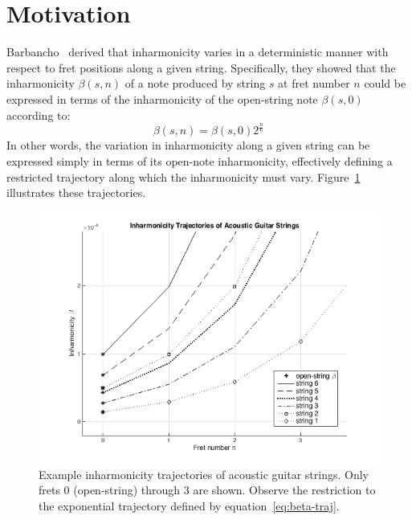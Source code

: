 \documentclass[12pt]{cmuthesis}
\begin{document}
\section{Motivation}
Barbancho~\cite{barbanchoi2012} derived that inharmonicity varies in a deterministic manner with respect to fret positions along a given string. Specifically, they showed that the inharmonicity $\beta(s,n)$ of a note produced by string $s$ at fret number $n$ could be expressed in terms of the inharmonicity of the open-string note $\beta(s,0)$ according to:
\begin{equation} 
\label{eq:beta-traj}
\beta(s,n) = \beta(s,0)2^{\frac{n}{6}}
\end{equation}
In other words, the variation in inharmonicity along a given string can be expressed simply in terms of its open-note inharmonicity, effectively defining a restricted trajectory along which the inharmonicity must vary. Figure~\ref{fig:beta-trajectories-ag} illustrates these trajectories.

\begin{figure}[h] 
\centering
\includegraphics[scale=0.70]{beta-trajectories-ag}
\caption{Example inharmonicity trajectories of acoustic guitar strings. Only frets 0 (open-string) through 3 are shown. Observe the restriction to the exponential trajectory defined by equation~\eqref{eq:beta-traj}.}
\label{fig:beta-trajectories-ag}
\end{figure}
\end{document}
